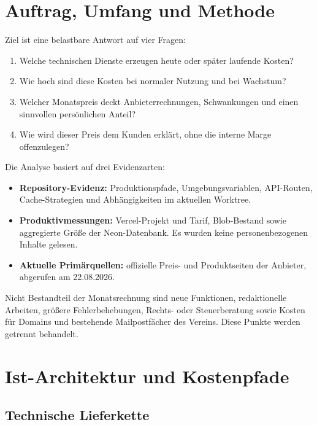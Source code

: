 \documentclass[11pt,a4paper]{article}
\begin{document}
\vspace{-2mm}
\tableofcontents
\newpage

\section{Auftrag, Umfang und Methode}

Ziel ist eine belastbare Antwort auf vier Fragen:

\begin{enumerate}
  \item Welche technischen Dienste erzeugen heute oder später laufende Kosten?
  \item Wie hoch sind diese Kosten bei normaler Nutzung und bei Wachstum?
  \item Welcher Monatspreis deckt Anbieterrechnungen, Schwankungen und einen sinnvollen persönlichen Anteil?
  \item Wie wird dieser Preis dem Kunden erklärt, ohne die interne Marge offenzulegen?
\end{enumerate}

Die Analyse basiert auf drei Evidenzarten:

\begin{itemize}
  \item \textbf{Repository-Evidenz:} Produktionspfade, Umgebungsvariablen, API-Routen, Cache-Strategien und Abhängigkeiten im aktuellen Worktree.
  \item \textbf{Produktivmessungen:} Vercel-Projekt und Tarif, Blob-Bestand sowie aggregierte Größe der Neon-Datenbank. Es wurden keine personenbezogenen Inhalte gelesen.
  \item \textbf{Aktuelle Primärquellen:} offizielle Preis- und Produktseiten der Anbieter, abgerufen am 22.08.2026.
\end{itemize}

Nicht Bestandteil der Monatsrechnung sind neue Funktionen, redaktionelle Arbeiten, größere Fehlerbehebungen, Rechts- oder Steuerberatung sowie Kosten für Domains und bestehende Mailpostfächer des Vereins. Diese Punkte werden getrennt behandelt.

\section{Ist-Architektur und Kostenpfade}

\subsection{Technische Lieferkette}
\end{document}
